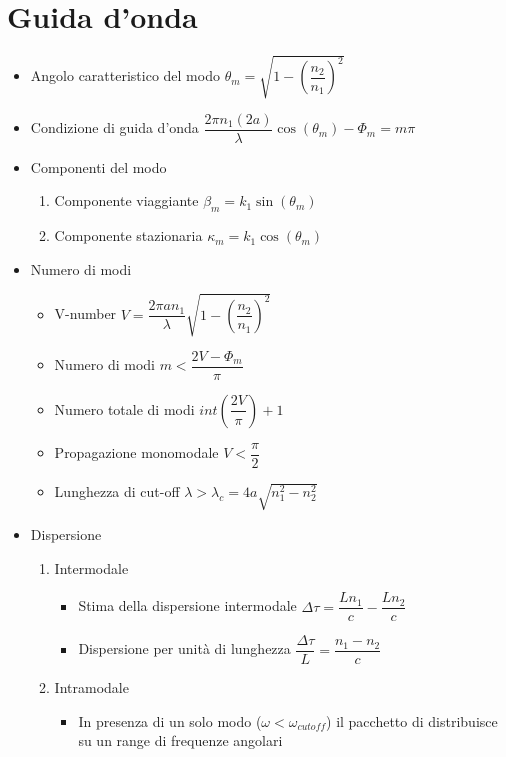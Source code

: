 \documentclass{article}
\begin{document}
\section{Guida d'onda}
\begin{itemize}
  \item Angolo caratteristico del modo \( \theta_m = \sqrt{1 - \left(\dfrac{n_2}{n_1} \right) ^ 2} \)
  \item Condizione di guida d'onda \( \dfrac{2 \pi n_1 (2 a)}{\lambda} \cos(\theta_m) - \Phi_m = m \pi \)
  \item Componenti del modo
        \begin{enumerate}
          \item Componente viaggiante \( \beta_m = k_1 \sin(\theta_m)\)
          \item Componente stazionaria \( \kappa_m = k_1 \cos(\theta_m) \)
        \end{enumerate}
  \item Numero di modi
        \begin{itemize}
          \item V-number \(\displaystyle V = \dfrac{2 \pi a n_1}{\lambda} \sqrt{1 - \left(\dfrac{n_2}{n_1}\right) ^ 2} \)
          \item Numero di modi \( m < \dfrac{2V - \Phi_m}{\pi} \)
          \item Numero totale di modi \( int\left(\dfrac{2V}{\pi} \right) + 1 \)
          \item Propagazione monomodale \( V < \dfrac{\pi}{2} \)
          \item Lunghezza di cut-off \( \lambda > \lambda_c = 4a \sqrt{n_1^2 - n_2^2} \)
        \end{itemize}
  \item Dispersione
        \begin{enumerate}
          \item Intermodale
                \begin{itemize}
                  \item Stima della dispersione intermodale \( \Delta \tau = \dfrac{L n_1}{c} - \dfrac{L n_2}{c} \)
                  \item Dispersione per unità di lunghezza \(  \dfrac{\Delta \tau}{L} = \dfrac{n_1 - n_2}{c} \)
                \end{itemize}
          \item Intramodale
                \begin{itemize}
                  \item In presenza di un solo modo (\( \omega < \omega_{cutoff} \)) il pacchetto di distribuisce su un range di frequenze angolari

\end{itemize}
\end{enumerate}
\end{itemize}
\end{document}
